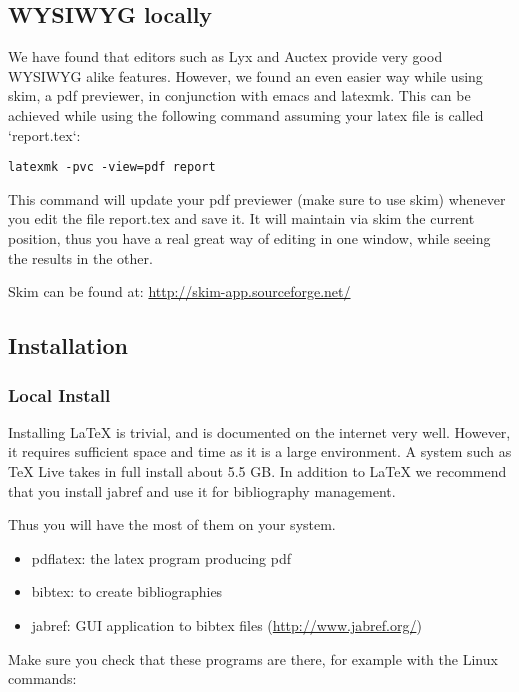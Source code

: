 \subsection{WYSIWYG locally}\label{wysiwyg-locally}

We have found that editors such as Lyx and Auctex provide very good
WYSIWYG alike features. However, we found an even easier way while using
skim, a pdf previewer, in conjunction with emacs and latexmk. This can
be achieved while using the following command assuming your latex file
is called `report.tex`:

\begin{verbatim}
latexmk -pvc -view=pdf report
\end{verbatim}

This command will update your pdf previewer (make sure to use skim)
whenever you edit the file report.tex and save it. It will maintain via
skim the current position, thus you have a real great way of editing in
one window, while seeing the results in the other.

Skim can be found at: \url{http://skim-app.sourceforge.net/}

\subsection{Installation}\label{installation}

\subsubsection{Local Install}\label{local-install}

Installing LaTeX is trivial, and is documented on the internet very
well. However, it requires sufficient space and time as it is a large
environment. A system such as TeX Live takes in full install about 5.5
GB. In addition to LaTeX we recommend that you install jabref and use it
for bibliography management.

Thus you will have the most of them on your system.

\begin{itemize}
\tightlist
\item
  pdflatex: the latex program producing pdf
\item
  bibtex: to create bibliographies
\item
  jabref: GUI application to bibtex files (\url{http://www.jabref.org/})
\end{itemize}

Make sure you check that these programs are there, for example with the
Linux commands:


